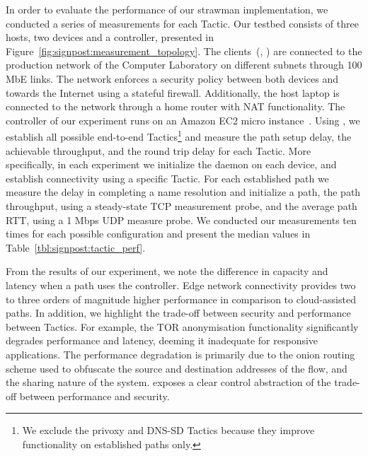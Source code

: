In order to evaluate the performance of our strawman implementation, we conducted
a series of measurements for each Tactic.  Our testbed consists of three hosts,
two \signpost devices and a \signpost controller, presented in
Figure~\ref{fig:signpost:measurement_topology}. The \signpost
clients~(, ) are connected to the production
network of the Computer Laboratory on different subnets through 100 MbE links.
The network enforces a security policy between both devices and towards the
Internet using a stateful firewall.  Additionally, the host laptop is connected
to the network through a home router with NAT functionality. The \signpost
controller of our experiment runs on an Amazon EC2 micro
instance~. Using \signpost, we establish all possible
end-to-end Tactics\footnote{We exclude the privoxy and DNS-SD Tactics because
they improve functionality on established paths only.} and measure the path
setup delay, the achievable throughput, and the round trip delay for each
Tactic. More specifically, in each experiment we initialize the \signpost
daemon on each device, and establish connectivity using a specific Tactic. For
each established path we measure the delay in completing a \signpost name
resolution and initialize a \signpost path, the path throughput, using a
steady-state TCP measurement probe, and the average path RTT, using a 1 Mbps
UDP measure probe. We conducted our measurements ten times for each possible
configuration and present the median values in
Table~\ref{tbl:signpost:tactic_perf}. 

From the results of our experiment, we note the difference in capacity and latency
when a path uses the \signpost controller. Edge network connectivity provides
two to three orders of magnitude higher performance in comparison to
cloud-assisted paths.  In addition, we highlight the trade-off between security
and performance between Tactics. For example, the TOR anonymisation
functionality significantly degrades performance and latency, deeming it
inadequate for responsive applications. The performance degradation is primarily
due to the onion routing scheme used to obfuscate the source and destination
addresses of the flow, and the sharing nature of the system.  \signpost exposes a
clear control abstraction of the trade-off between performance and security. 


